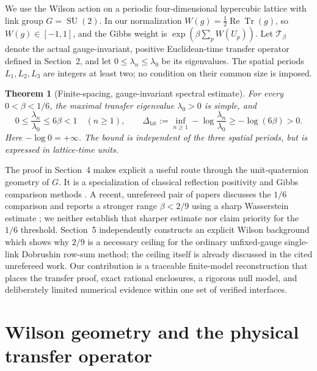 \documentclass[11pt,a4paper]{article}
\numberwithin{equation}{section}
\newtheorem{theorem}{Theorem}[section]
\newcommand{\SU}{\operatorname{SU}(2)}
\newcommand{\Tr}{\operatorname{Tr}}
\begin{document}
We use the Wilson action on a periodic four-dimensional hypercubic
lattice with link group \(G=\SU\). In our normalization
\(W(g)=\frac12\operatorname{Re}\Tr(g)\), so \(W(g)\in[-1,1]\), and the
Gibbs weight is \(\exp(\beta\sum_p W(U_p))\).
Let \(\mathcal T_\beta\) denote the actual gauge-invariant,
positive Euclidean-time transfer operator defined in Section~2,
and let \(0\leq\lambda_n\leq\lambda_0\) be its eigenvalues.
The spatial periods \(L_1,L_2,L_3\) are integers at least two;
no condition on their common size is imposed.

\begin{theorem}[Finite-spacing, gauge-invariant spectral estimate]
\label{thm:main}
For every \(0<\beta<1/6\), the maximal transfer eigenvalue
\(\lambda_0>0\) is simple, and
\begin{equation}
 0\leq \frac{\lambda_n}{\lambda_0}\leq 6\beta<1
 \quad(n\geq1),\qquad
 \Delta_{\mathrm{lat}}
 :=\inf_{n\geq1}-\log\frac{\lambda_n}{\lambda_0}
 \geq-\log(6\beta)>0.                         \label{eq:main}
\end{equation}
Here \(-\log0=+\infty\). The bound is independent of the three
spatial periods, but is expressed in \emph{lattice-time units}.
\end{theorem}

The proof in Section~4 makes explicit a useful route through
the unit-quaternion geometry of \(G\). It is a specialization of
classical reflection positivity and Gibbs comparison methods
\cite{OsterwalderSeiler,Follmer,RebeschiniVanHandel}.
A recent, unrefereed pair of papers discusses the \(1/6\)
comparison and reports a stronger range \(\beta<2/9\) using
a sharp Wasserstein estimate
\cite{BhattacharjeeBhattacharyaShort,BhattacharjeeBhattacharya};
we neither establish that sharper estimate nor claim
priority for the \(1/6\) threshold.
Section~5 independently constructs an explicit Wilson background
which shows why \(2/9\) is a necessary ceiling for the ordinary
unfixed-gauge single-link Dobrushin row-sum method; the ceiling itself
is already discussed in the cited unrefereed work.
Our contribution is a traceable finite-model reconstruction that
places the transfer proof, exact rational enclosures, a rigorous
null model, and deliberately limited numerical evidence within
one set of verified interfaces.

\section{Wilson geometry and the physical transfer operator}
\label{sec:transfer}
\end{document}
